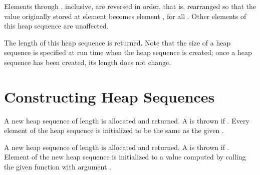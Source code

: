 
Elements  through , inclusive, are reversed in order,
that is, rearranged
so that the value originally stored at element  becomes element
, for all .
Other elements of this heap sequence are unaffected.



The length of this heap sequence is returned.  Note that the size of a heap sequence is specified
at run time when the heap sequence is created;  once a heap sequence has been created,
its length does not change.


\section{Constructing Heap Sequences}


A new heap sequence of length  is allocated and returned.
A  is thrown if .
Every element of the heap sequence is initialized to be the same as the given .



A new heap sequence of length  is allocated and returned.
A  is thrown if .
Element  of the new heap sequence is initialized to a value
computed by calling the given function  with argument .




